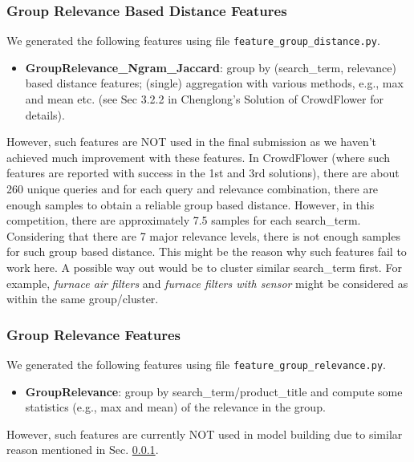 \documentclass[12pt]{article}
\begin{document}
\subsubsection{Group Relevance Based Distance Features}
\label{subsubsec:Feature_Chenglong_Group_Dist}
We generated the following features using file \texttt{feature\_group\_distance.py}.
\begin{itemize}
\item \textbf{GroupRelevance\_Ngram\_Jaccard}: group by (search\_term, relevance) based distance features; (single) aggregation with various methods, e.g., max and mean etc. (see Sec 3.2.2 in Chenglong's Solution of CrowdFlower for details).
\end{itemize}
However, such features are NOT used in the final submission as we haven't achieved much improvement with these features. In CrowdFlower (where such features are reported with success in the 1st and 3rd solutions), there are about 260 unique queries and for each query and relevance combination, there are enough samples to obtain a reliable group based distance. However, in this competition, there are approximately 7.5 samples for each search\_term. Considering that there are 7 major relevance levels, there is not enough samples for such group based distance. This might be the reason why such features fail to work here. A possible way out would be to cluster similar search\_term first. For example, \emph{furnace air filters} and \emph{furnace filters with sensor} might be considered as within the same group/cluster.

\subsubsection{Group Relevance Features}
We generated the following features using file \texttt{feature\_group\_relevance.py}.
\begin{itemize}
\item \textbf{GroupRelevance}: group by search\_term/product\_title and compute some statistics (e.g., max and mean) of the relevance in the group.
\end{itemize}
However, such features are currently NOT used in model building due to similar reason mentioned in Sec. \ref{subsubsec:Feature_Chenglong_Group_Dist}.
\end{document}
